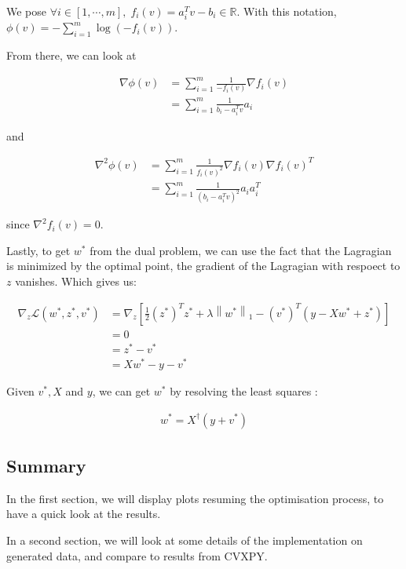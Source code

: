 \documentclass[11pt]{article}
\begin{document}
We pose
\(\forall i \in [1, \cdots, m], \; f_i(v) = a_i^T v - b_i \in \mathbb{R}\).
With this notation,
\(\phi(v) = - \displaystyle \sum_{i=1}^m \log(-f_i(v))\).

From there, we can look at

\begin{align*}
\nabla \phi(v) &= \sum_{i=1}^m \frac{1}{- f_i(v)} \nabla f_i(v) \\
&= \sum_{i=1}^m \frac{1}{b_i - a_i^T v} a_i
\end{align*}

and

\begin{align*}
\nabla^2 \phi(v) &= \sum_{i=1}^m \frac{1}{f_i(v)^2} \nabla f_i(v) \nabla f_i(v)^T \\
&= \sum_{i=1}^m \frac{1}{(b_i - a_i^T v)^2} a_i a_i^T
\end{align*}

since \(\nabla^2 f_i(v) = 0\).

Lastly, to get \(w^*\) from the dual problem, we can use the fact that
the Lagragian is minimized by the optimal point, the gradient of the
Lagragian with respoect to \(z\) vanishes. Which gives us:

\begin{align*}
    \nabla_z \mathcal{L}(w^*, z^*, v^*) &= \nabla_z \left[ \frac{1}{2} (z^*)^T z^* + \lambda \left\lVert w^* \right\rVert_1 - (v^*)^T (y-Xw^*+z^*) \right] \\
    &= 0 \\
    &= z^* - v^* \\
    &= X w^* - y - v^*
\end{align*}

Given \(v^*, X\) and \(y\), we can get \(w^*\) by resolving the least
squares :

\begin{align*}
    w^* = X^{\dagger}(y + v^*)
\end{align*}

    \hypertarget{summary}{%
\subsection{Summary}\label{summary}}

In the first section, we will display plots resuming the optimisation
process, to have a quick look at the results.

In a second section, we will look at some details of the implementation
on generated data, and compare to results from CVXPY.
\end{document}
